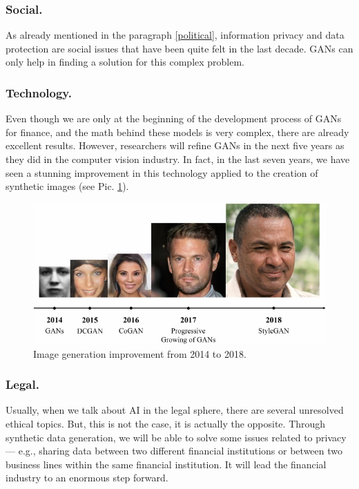 \documentclass[runningheads]{llncs}
\begin{document}
\subsubsection{Social.}
As already mentioned in the paragraph \ref{political}, information privacy and data protection are social issues that have been quite felt in the last decade. GANs can only help in finding a solution for this complex problem.
\subsubsection{Technology.}
Even though we are only at the beginning of the development process of GANs for finance, and the math behind these models is very complex, there are already excellent results. However, researchers will refine GANs in the next five years as they did in the computer vision industry. In fact, in the last seven years, we have seen a stunning improvement in this technology applied to the creation of synthetic images (see Pic. \ref{improvement}).

\begin{figure}
\includegraphics[width=\textwidth]{gan_improvement.jpg}
\caption{Image generation improvement from 2014 to 2018.}\label{improvement}
\end{figure}

\subsubsection{Legal.}
Usually, when we talk about AI in the legal sphere, there are several unresolved ethical topics. But, this is not the case, it is actually the opposite. Through synthetic data generation, we will be able to solve some issues related to privacy — e.g., sharing data between two different financial institutions or between two business lines within the same financial institution. It will lead the financial industry to an enormous step forward.
\end{document}
